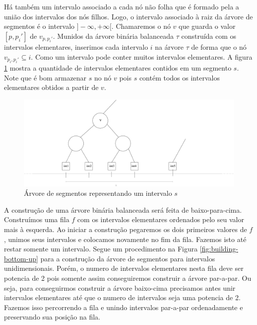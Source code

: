 Há também um intervalo associado a cada nó não folha que é formado pela a união dos intervalos dos nós filhos. Logo, o intervalo associado à raiz da árvore de segmentos é o intervalo $]-\infty, +\infty[$. Chamaremos o nó $v$ que guarda o valor $[p, p_i']$ de $v_{p, p_i'}$.  Munidos da árvore binária balanceada $\tau$ construída com os intervalos elementares, inserimos cada intervalo $i$ na árvore $\tau$ de forma que o nó $v_{p_i, p_i'} \subseteq i$. Como um intervalo pode conter muitos intervalos elementares. A figura \ref{fig:segment_tree1} mostra a quantidade de intervalos elementares contidos em um segmento $s$. Note que é bom armazenar $s$ no nó $v$ pois $s$ contém todos os intervalos elementares obtidos a partir de $v$. %

\begin{figure}[h!]
    \centering
    \includegraphics[scale=0.5]{images/elementary_seg_tree.pdf}
    \caption{Árvore de segmentos representando um intervalo $s$ }
    \label{fig:segment_tree1}
\end{figure}

A construção de uma árvore binária balanceada será feita de baixo-para-cima. Construímos uma fila $f$ com os intervalos elementares ordenados pelo seu valor mais à esquerda. Ao iniciar a construção pegaremos os dois primeiros valores de $f$, unimos seus intervalos e colocamos novamente no fim da fila. Fazemos isto até restar somente um intervalo. Segue um procedimento na Figura \ref{fig:building-bottom-up} para a construção da árvore de segmentos para intervalos unidimensionais.
Porém, o numero de intervalos elementares nesta fila deve ser potencia de 2 pois somente assim conseguiremos construir a árvore par-a-par. Ou seja, para conseguirmos construir a árvore baixo-cima precisamos antes unir intervalos elementares até que o numero de intervalos seja uma potencia de 2. Fazemos isso percorrendo a fila e unindo intervalos par-a-par ordenadamente e preservando sua posição na fila.

